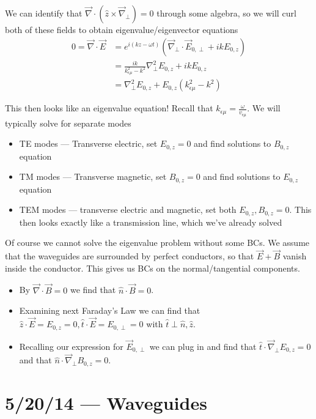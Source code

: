 \documentclass[10pt]{report}
\begin{document}
We can identify that $\vec{\nabla} \cdot \left( \hat{z} \times \vec{\nabla}_{\perp} \right) = 0$ through some algebra, so we will curl both of these fields to obtain eigenvalue/eigenvector equations
\begin{align}
    0 = \vec{\nabla} \cdot \vec{E} &= e^{i(kz - \omega t)}\left( \vec{\nabla}_{\perp} \cdot \vec{E}_{0,\perp} + ikE_{0,z} \right)\\
    &= \frac{ik}{k_{\epsilon \mu}^2 - k^2}\nabla^2_{\perp} E_{0,z} + ikE_{0,z}\\
    &= \nabla^2_{\perp} E_{0,z} + E_{0,z}\left(k_{\epsilon \mu}^2 - k^2\right)
\end{align}

This then looks like an eigenvalue equation! Recall that $k_{\epsilon \mu} = \frac{\omega}{v_{\epsilon \mu}}$. We will typically solve for separate modes
\begin{itemize}
    \item TE modes --- Transverse electric, set $E_{0,z} = 0$ and find solutions to $B_{0,z}$ equation
    \item TM modes --- Transverse magnetic, set $B_{0,z} = 0$ and find solutions to $E_{0,z}$ equation
    \item TEM modes --- transverse electric and magnetic, set both $E_{0,z}, B_{0,z} = 0$. This then looks exactly like a transmission line, which we've already solved
\end{itemize}

Of course we cannot solve the eigenvalue problem without some BCs. We assume that the waveguides are surrounded by perfect conductors, so that $\vec{E} + \vec{B}$ vanish inside the conductor. This gives us BCs on the normal/tangential components. 
\begin{itemize}
    \item By $\vec{\nabla} \cdot \vec{B} = 0$ we find that $\hat{n} \cdot \vec{B} = 0$. 
    \item Examining next Faraday's Law we can find that $\hat{z} \cdot \vec{E} = E_{0,z} = 0, \hat{t} \cdot \vec{E} = E_{0, \perp} = 0$ with $\hat{t} \perp \hat{n}, \hat{z}$.
    \item Recalling our expression for $\vec{E}_{0,\perp}$ we can plug in and find that $\hat{t} \cdot \vec{\nabla}_{\perp} E_{0,z} = 0$ and that $\hat{n} \cdot \vec{\nabla}_{\perp}B_{0,z} = 0$.

\end{itemize}
\chapter{5/20/14 --- Waveguides}
\end{document}
